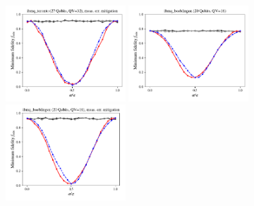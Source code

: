 \documentclass[a4paper]{article}
\begin{document}
\begin{figure}[H]
	\includegraphics[width=0.4\textwidth]{fmin_qc2_mit0}
	\includegraphics[width=0.4\textwidth]{fmin_qc3_mit1}
	\includegraphics[width=0.4\textwidth]{fmin_qc3_mit0}
\end{figure}
\end{document}
